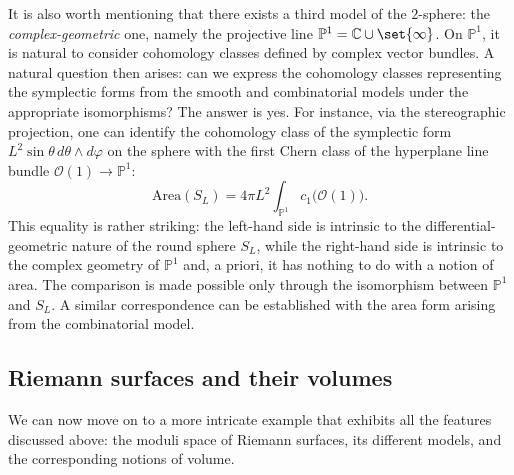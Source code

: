 \documentclass[a4paper,11pt,english]{article}
\theoremstyle{plain}
\theoremstyle{definition}
\theoremstyle{plain}
\newcommand{\mc}[1]{\mathcal{#1}}
\newcommand{\C}{\mathbb{C}}
\renewcommand{\P}{\mathbb{P}}
\begin{document}
It is also worth mentioning that there exists a third model of the $2$-sphere: the \emph{complex-geometric} one, namely the projective line $\P^1 = \C \cup \set{\infty}$. On $\P^1$, it is natural to consider cohomology classes defined by complex vector bundles. A natural question then arises: can we express the cohomology classes representing the symplectic forms from the smooth and combinatorial models under the appropriate isomorphisms? The answer is yes. For instance, via the stereographic projection, one can identify the cohomology class of the symplectic form $L^2 \sin\theta \, d\theta \wedge d\varphi$ on the sphere with the first Chern class of the hyperplane line bundle $\mc{O}(1) \to \P^1$:
\begin{equation}
    \mathrm{Area}(S_L)
    = 
    4\pi L^2 \int_{\P^1} c_1\bigl( \mc{O}(1) \bigr).
\end{equation}
This equality is rather striking: the left-hand side is intrinsic to the differential-geometric nature of the round sphere $S_L$, while the right-hand side is intrinsic to the complex geometry of $\P^1$ and, a priori, it has nothing to do with a notion of area. The comparison is made possible only through the isomorphism between $\P^1$ and $S_L$. A similar correspondence can be established with the area form arising from the combinatorial model.

\subsection{Riemann surfaces and their volumes}
We can now move on to a more intricate example that exhibits all the features discussed above: the moduli space of Riemann surfaces, its different models, and the corresponding notions of volume.
\end{document}
